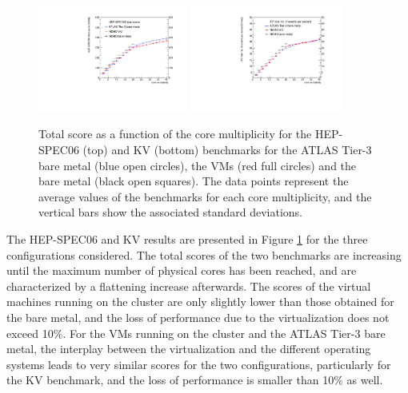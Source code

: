 \begin{figure}[htbp]
\centering
\includegraphics[width=0.44\textwidth]{figures/benchmark-hepspec06-total.pdf}
\includegraphics[width=0.44\textwidth]{figures/kv-BFG-BM-NEMO-VM-NEMO-BM-total.pdf} 
\caption{Total score as a function of the core multiplicity for the HEP-SPEC06 (top) and KV (bottom) benchmarks for the ATLAS Tier-3 bare metal (blue open circles),
the \NEMO VMs (red full circles) and the \NEMO bare metal (black open squares). The data points represent the average values of the benchmarks for each core multiplicity,
and the vertical bars show the associated standard deviations.}
\label{bmk-total}
\end{figure}

The HEP-SPEC06 and KV results are presented in Figure \ref{bmk-total} for the three configurations considered.
The total scores of the two benchmarks are increasing until the maximum number of physical cores has been reached, and are characterized by a flattening increase afterwards.
The scores of the virtual machines running on the \NEMO cluster are only slightly lower than those obtained for the \NEMO bare metal, and the loss of performance
due to the virtualization does not exceed 10$\%$.
For the VMs running on the \NEMO cluster and the ATLAS Tier-3 bare metal, the interplay between the virtualization and the different operating systems leads to very similar scores
for the two configurations, particularly for the KV benchmark, and the loss of performance is smaller than 10$\%$ as well.


%
%
